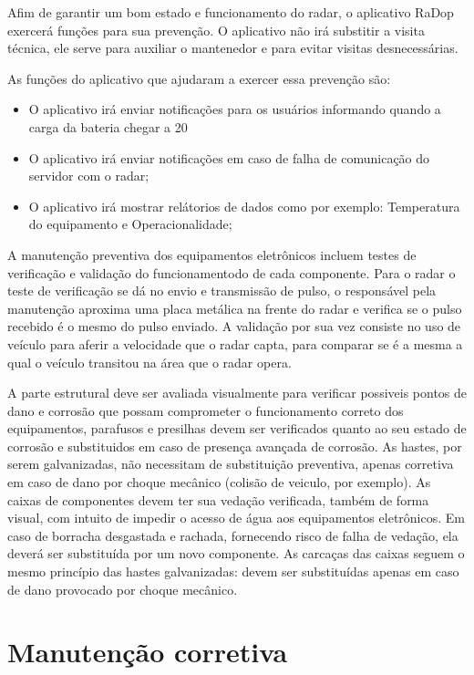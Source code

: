 Afim de garantir um bom estado e funcionamento do radar, o aplicativo RaDop exercerá funções para sua prevenção. O aplicativo não irá substitir a visita técnica, ele serve para auxiliar o mantenedor e  para evitar visitas desnecessárias.

As funções do aplicativo que ajudaram a exercer essa prevenção são:
\begin{itemize}
\item O aplicativo irá enviar notificações para os usuários informando quando a carga da bateria chegar a 20%
\item O aplicativo irá enviar notificações em caso de falha de comunicação do servidor com o radar;
\item O aplicativo irá mostrar relátorios de dados como por exemplo: Temperatura do equipamento e Operacionalidade;
\end{itemize}

A manutenção preventiva dos equipamentos eletrônicos incluem testes de verificação e validação do funcionamentodo de cada componente.
Para o radar o teste de verificação se dá no envio e transmissão de pulso, o responsável pela manutenção aproxima uma placa metálica na frente do radar e verifica se o pulso recebido é o mesmo do pulso enviado. A validação por sua vez consiste no uso de veículo para aferir a velocidade que o radar capta, para comparar se é a mesma a qual o veículo transitou na área que o radar opera.

A parte estrutural deve ser avaliada visualmente para verificar possiveis pontos de dano e corrosão que possam comprometer o funcionamento correto dos equipamentos, parafusos e presilhas devem ser verificados quanto ao seu estado de corrosão e substituidos em caso de presença avançada de corrosão. As hastes, por serem galvanizadas, não necessitam de substituição preventiva, apenas corretiva em caso de dano por choque mecânico (colisão de veiculo, por exemplo). As caixas de componentes devem ter sua vedação verificada, também de forma visual, com intuito de impedir o acesso de água aos equipamentos eletrônicos. Em caso de borracha desgastada e rachada, fornecendo risco de falha de vedação, ela deverá ser substituída por um novo componente. As carcaças das caixas seguem o mesmo princípio das hastes galvanizadas: devem ser substituídas apenas em caso de dano provocado por choque mecânico. 



\section{Manutenção corretiva}

